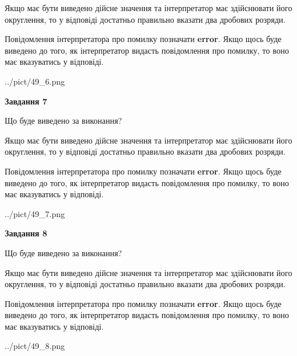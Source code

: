 \documentclass[12pt, ukrainian]{article}
\begin{document}
{\begin {Large}
Якщо має бути виведено дійсне значення та інтерпретатор має здійснювати його округлення, 
то у відповіді достатньо правильно вказати два дробових розряди.

Повідомлення інтерпретатора про помилку позначати \textbf{error}.
Якщо щось буде виведено до того, як інтерпретатор видасть повідомлення про помилку, 
то воно має вказуватись у відповіді. \par

\begin{center}
	{../pict/49_6.png}
\end{center}
\newpage

{\begin {center}\textbf{Завдання 7}\end {center}}\par
Що буде виведено за виконання? \par

Якщо має бути виведено дійсне значення та інтерпретатор має здійснювати його округлення, 
то у відповіді достатньо правильно вказати два дробових розряди.

Повідомлення інтерпретатора про помилку позначати \textbf{error}.
Якщо щось буде виведено до того, як інтерпретатор видасть повідомлення про помилку, 
то воно має вказуватись у відповіді. \par

\begin{center}
	{../pict/49_7.png}
\end{center}
\newpage

{\begin {center}\textbf{Завдання 8}\end {center}}\par
Що буде виведено за виконання? \par

Якщо має бути виведено дійсне значення та інтерпретатор має здійснювати його округлення, 
то у відповіді достатньо правильно вказати два дробових розряди.

Повідомлення інтерпретатора про помилку позначати \textbf{error}.
Якщо щось буде виведено до того, як інтерпретатор видасть повідомлення про помилку, 
то воно має вказуватись у відповіді. \par

\begin{center}
	{../pict/49_8.png}
\end{center}
\newpage


\end{Large}}
\end{document}
